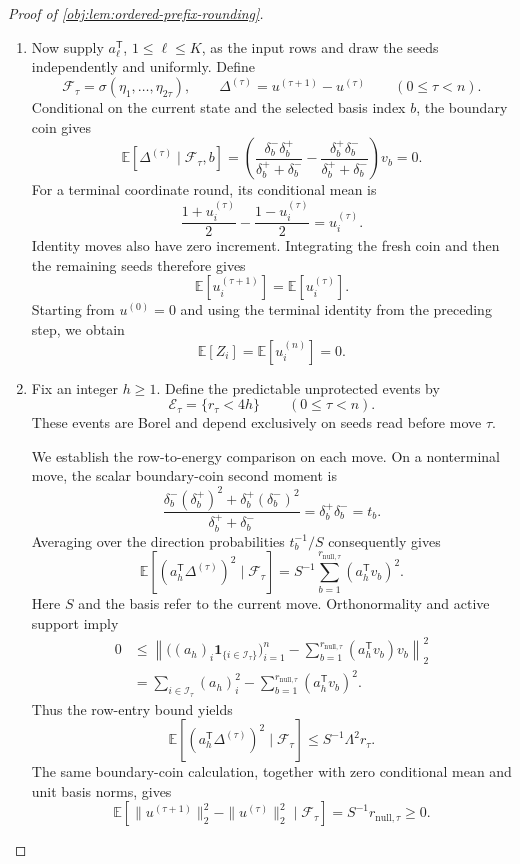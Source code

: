 \begin{proof}[Proof of \cref{obj:lem:ordered-prefix-rounding}]
\begin{enumerate}
\item
Now supply \(a_\ell^{\mathsf T}\), \(1\leq\ell\leq K\), as the input rows and draw the seeds independently and uniformly. Define
\[
\mathcal F_\tau=\sigma(\eta_1,\ldots,\eta_{2\tau}),
\qquad
\Delta^{(\tau)}=u^{(\tau+1)}-u^{(\tau)}
\qquad(0\leq\tau<n).
\]
Conditional on the current state and the selected basis index \(b\), the boundary coin gives
\[
\mathbb E[\Delta^{(\tau)}\mid\mathcal F_\tau,b]
=
\left(
\frac{\delta_b^-\delta_b^+}{\delta_b^++\delta_b^-}
-
\frac{\delta_b^+\delta_b^-}{\delta_b^++\delta_b^-}
\right)v_b
=0.
\]
For a terminal coordinate round, its conditional mean is
\[
\frac{1+u_i^{(\tau)}}2
-
\frac{1-u_i^{(\tau)}}2
=u_i^{(\tau)}.
\]
Identity moves also have zero increment. Integrating the fresh coin and then the remaining seeds therefore gives
\[
\mathbb E[u_i^{(\tau+1)}]
=\mathbb E[u_i^{(\tau)}].
\]
Starting from \(u^{(0)}=0\) and using the terminal identity from the preceding step, we obtain
\[
\mathbb E[Z_i]=\mathbb E[u_i^{(n)}]=0.
\]

\item
Fix an integer \(h\geq1\). Define the predictable unprotected events by
\[
\mathcal E_\tau=\{r_\tau<4h\}
\qquad(0\leq\tau<n).
\]
These events are Borel and depend exclusively on seeds read before move \(\tau\).

We establish the row-to-energy comparison on each move. On a nonterminal move, the scalar boundary-coin second moment is
\[
\frac{\delta_b^-(\delta_b^+)^2+\delta_b^+(\delta_b^-)^2}
{\delta_b^++\delta_b^-}
=\delta_b^+\delta_b^-=t_b.
\]
Averaging over the direction probabilities \(t_b^{-1}/S\) consequently gives
\[
\mathbb E\!\left[(a_h^{\mathsf T}\Delta^{(\tau)})^2\mid\mathcal F_\tau\right]
=
S^{-1}\sum_{b=1}^{r_{\mathrm{null},\tau}}
(a_h^{\mathsf T}v_b)^2.
\]
Here \(S\) and the basis refer to the current move. Orthonormality and active support imply
\[
\begin{aligned}
0
&\leq
\left\|
\bigl((a_h)_i\mathbf1_{\{i\in\mathcal I_\tau\}}\bigr)_{i=1}^n
-
\sum_{b=1}^{r_{\mathrm{null},\tau}}
(a_h^{\mathsf T}v_b)v_b
\right\|_2^2\\
&=
\sum_{i\in\mathcal I_\tau}(a_h)_i^2
-
\sum_{b=1}^{r_{\mathrm{null},\tau}}(a_h^{\mathsf T}v_b)^2.
\end{aligned}
\]
Thus the row-entry bound yields
\[
\mathbb E\!\left[(a_h^{\mathsf T}\Delta^{(\tau)})^2\mid\mathcal F_\tau\right]
\leq S^{-1}\Lambda^2r_\tau.
\]
The same boundary-coin calculation, together with zero conditional mean and unit basis norms, gives
\[
\mathbb E\!\left[
\|u^{(\tau+1)}\|_2^2-\|u^{(\tau)}\|_2^2
\mid\mathcal F_\tau\right]
=S^{-1}r_{\mathrm{null},\tau}\geq0.
\]


\end{enumerate}
\end{proof}
